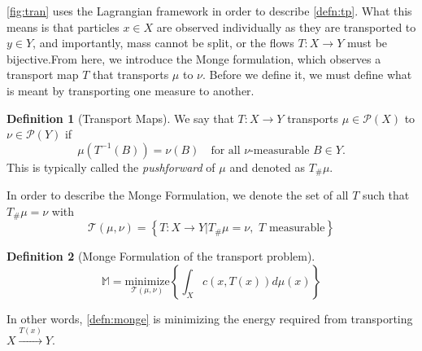\documentclass[psamsfonts]{amsart}
\theoremstyle{definition}
\newtheorem{defn}{Definition}[section]
\numberwithin{equation}{section}
\begin{document}
\autoref{fig:tran} uses the Lagrangian framework in order to describe \autoref{defn:tp}. What this means is that particles $x\in X$ are observed individually as they are transported to $y\in Y$, and importantly, mass cannot be split, or the flows $T: X\to Y$ must be bijective.\newline From here, we introduce
the Monge formulation, which observes a transport map $T$ that transports $\mu$ to $\nu$. Before we define it, we must define what is meant by transporting one measure to another.
\begin{defn}[Transport Maps]\label{defn:transport_map}
  We say that $T: X\to Y$ transports $\mu\in \mathcal{P}(X)$ to $\nu\in\mathcal{P}(Y)$ if 
  \begin{equation*}\label{eqn:pushforward}
    \mu(T^{-1}(B)) = \nu(B) \quad\text{for all $\nu$-measurable $B\in Y$.}
  \end{equation*}
  This is typically called the \textit{pushforward} of $\mu$ and denoted as $T_\#\mu$.
\end{defn} 
In order to describe the Monge Formulation, we denote the set of all $T$ such that $T_\#\mu=\nu$ with
\begin{equation}
  \mathcal{T}(\mu,\nu) = \left\{T: X\to Y \vert T_\#\mu = \nu,\,\,\text{$T$ measurable} \right\}
\end{equation}
\begin{defn}[Monge Formulation of the transport problem]\label{defn:monge}
  \begin{equation}
    \mathbb{M} = \underset{\mathcal{T}(\mu,\nu)}{\text{minimize}}\left\{\int_X c(x,T(x))d\mu(x)\right\}
  \end{equation}
\end{defn}
In other words, \autoref{defn:monge} is minimizing the energy required from transporting $X\overset{T(x)}{\to}Y$. 
\end{document}
